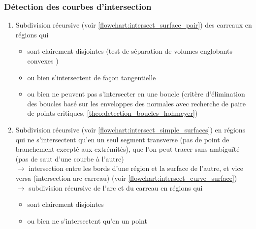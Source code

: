 \subsubsection{Détection des courbes d'intersection}
\begin{enumerate}
	\item Subdivision récursive (voir \autoref{flowchart:intersect_surface_pair}) des carreaux en régions qui
	\begin{itemize}
		\item sont clairement disjointes (test de séparation de volumes englobants convexes \cite{eberly1999})
		\item ou bien s'intersectent de façon tangentielle
		\item ou bien ne peuvent pas s'intersecter en une boucle (critère d'élimination des boucles basé sur les enveloppes des normales avec recherche de paire de points critiques, \cf \autoref{theo:detection_boucles_hohmeyer})
	\end{itemize}
	
	\item Subdivision récursive (voir \autoref{flowchart:intersect_simple_surfaces}) en régions qui ne s'intersectent qu'en un seul segment transverse (pas de point de branchement excepté aux extrémités), que l'on peut tracer sans ambiguïté (pas de saut d'une courbe à l'autre)\\
	$\to$ intersection entre les bords d'une région et la surface de l'autre, et vice versa (intersection arc-carreau) (voir \autoref{flowchart:intersect_curve_surface})\\
	$\to$ subdivision récursive de l'arc et du carreau en régions qui
	\begin{itemize}
		\item sont clairement disjointes
		\item ou bien ne s'intersectent qu'en un point
	\end{itemize}
\end{enumerate}

